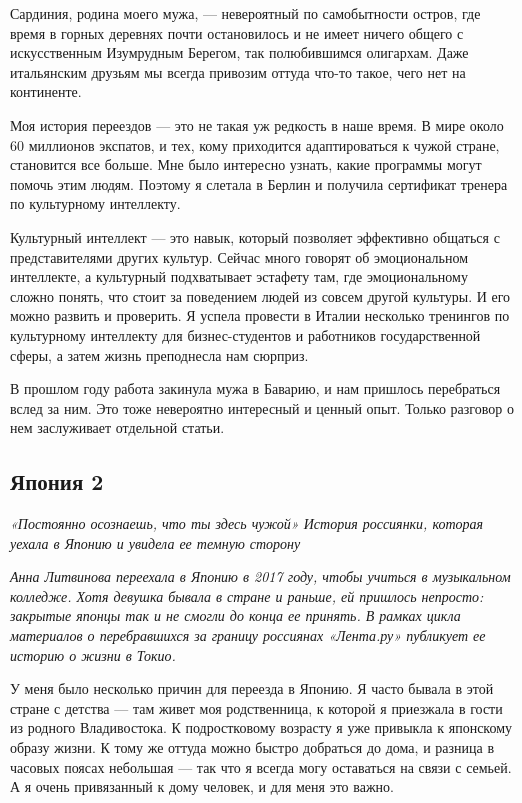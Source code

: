 Сардиния, родина моего мужа, — невероятный по самобытности остров, где время в горных деревнях почти остановилось и не имеет ничего общего с искусственным Изумрудным Берегом, так полюбившимся олигархам. Даже итальянским друзьям мы всегда привозим оттуда что-то такое, чего нет на континенте.

Моя история переездов — это не такая уж редкость в наше время. В мире около 60 миллионов экспатов, и тех, кому приходится адаптироваться к чужой стране, становится все больше. Мне было интересно узнать, какие программы могут помочь этим людям. Поэтому я слетала в Берлин и получила сертификат тренера по культурному интеллекту.

Культурный интеллект — это навык, который позволяет эффективно общаться с представителями других культур. Сейчас много говорят об эмоциональном интеллекте, а культурный подхватывает эстафету там, где эмоциональному сложно понять, что стоит за поведением людей из совсем другой культуры. И его можно развить и проверить. Я успела провести в Италии несколько тренингов по культурному интеллекту для бизнес-студентов и работников государственной сферы, а затем жизнь преподнесла нам сюрприз.

В прошлом году работа закинула мужа в Баварию, и нам пришлось перебраться вслед за ним. Это тоже невероятно интересный и ценный опыт. Только разговор о нем заслуживает отдельной статьи.

\newpage
\subsection{Япония 2}

\textit{«Постоянно осознаешь, что ты здесь чужой» История россиянки, которая уехала в Японию и увидела ее темную сторону}

\textit{Анна Литвинова переехала в Японию в 2017 году, чтобы учиться в музыкальном колледже. Хотя девушка бывала в стране и раньше, ей пришлось непросто: закрытые японцы так и не смогли до конца ее принять. В рамках цикла материалов о перебравшихся за границу россиянах «Лента.ру» публикует ее историю о жизни в Токио.}

У меня было несколько причин для переезда в Японию. Я часто бывала в этой стране с детства — там живет моя родственница, к которой я приезжала в гости из родного Владивостока. К подростковому возрасту я уже привыкла к японскому образу жизни. К тому же оттуда можно быстро добраться до дома, и разница в часовых поясах небольшая — так что я всегда могу оставаться на связи с семьей. А я очень привязанный к дому человек, и для меня это важно.

